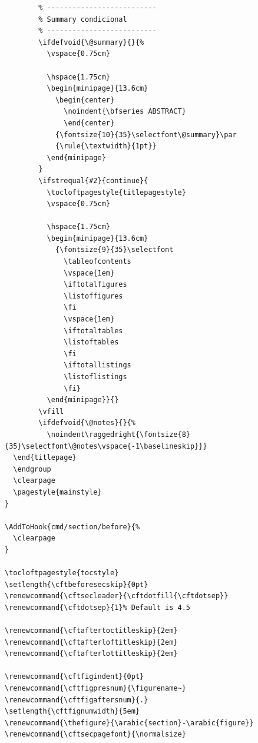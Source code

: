 \documentclass{reporti}
\begin{document}
\begin{verbatim}
        % --------------------------
        % Summary condicional
        % --------------------------
        \ifdefvoid{\@summary}{}{%
          \vspace{0.75cm}

          \hspace{1.75cm}
          \begin{minipage}{13.6cm}
            \begin{center}
              \noindent{\bfseries ABSTRACT}
              \end{center}
            {\fontsize{10}{35}\selectfont\@summary}\par
            {\rule{\textwidth}{1pt}}
          \end{minipage}
        }
        \ifstrequal{#2}{continue}{
          \tocloftpagestyle{titlepagestyle}
          \vspace{0.75cm}

          \hspace{1.75cm}
          \begin{minipage}{13.6cm}
            {\fontsize{9}{35}\selectfont
              \tableofcontents
              \vspace{1em}
              \iftotalfigures
              \listoffigures
              \fi
              \vspace{1em}
              \iftotaltables
              \listoftables
              \fi
              \iftotallistings
              \listoflistings
              \fi}
          \end{minipage}}{}
        \vfill
        \ifdefvoid{\@notes}{}{%
          \noindent\raggedright{\fontsize{8}{35}\selectfont\@notes\vspace{-1\baselineskip}}}
  \end{titlepage}
  \endgroup
  \clearpage
  \pagestyle{mainstyle}
}

\AddToHook{cmd/section/before}{%
  \clearpage
}

\tocloftpagestyle{tocstyle}
\setlength{\cftbeforesecskip}{0pt}
\renewcommand{\cftsecleader}{\cftdotfill{\cftdotsep}}
\renewcommand{\cftdotsep}{1}% Default is 4.5

\renewcommand{\cftaftertoctitleskip}{2em}
\renewcommand{\cftafterloftitleskip}{2em}
\renewcommand{\cftafterlottitleskip}{2em}

\renewcommand{\cftfigindent}{0pt}
\renewcommand{\cftfigpresnum}{\figurename~}
\renewcommand{\cftfigaftersnum}{.}
\setlength{\cftfignumwidth}{5em}
\renewcommand{\thefigure}{\arabic{section}-\arabic{figure}}
\renewcommand{\cftsecpagefont}{\normalsize}



\end{verbatim}
\end{document}

